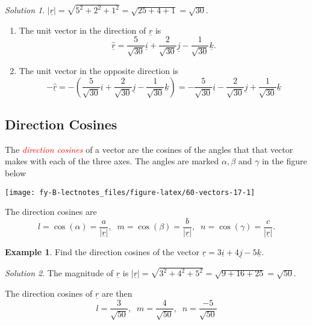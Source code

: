 \documentclass[
  11pt,
  oneside]{book}
\providecommand{\tightlist}{%
  \setlength{\itemsep}{0pt}\setlength{\parskip}{0pt}}
\newcommand{\slide}{}
\theoremstyle{definition}
\theoremstyle{definition}
\newtheorem{example}{Example}[chapter]
\theoremstyle{definition}
\theoremstyle{definition}
\theoremstyle{remark}
\newtheorem*{solution}{Solution}
\begin{document}
\begin{solution}

\(|\underline r| = \sqrt{5^2+2^2+1^2} = \sqrt{25+4+1} = \sqrt{30}\).

\begin{enumerate}
\def\labelenumi{\alph{enumi}.}
\tightlist
\item
  The unit vector in the direction of \(\underline r\) is
  \[
  \underline{\hat r} = \frac5{\sqrt{30}}\underline i+\frac2{\sqrt{30}}\underline j-\frac1{\sqrt{30}}\underline k.
  \]
\item
  The unit vector in the opposite direction is
  \[
  -\underline{\hat r} = -\left(\frac{5}{\sqrt{30}}\underline i+\frac{2}{\sqrt{30}}\underline j-\frac{1}{\sqrt{30}}\underline k\right) = -\frac{5}{\sqrt{30}}\underline i-\frac{2}{\sqrt{30}}\underline j+\frac{1}{\sqrt{30}}\underline k
  \]
\end{enumerate}

\end{solution}

\slide

\subsection{Direction Cosines}\label{direction-cosines}

The \textcolor{red}{\em direction cosines} of a vector are the cosines of the angles that that vector makes with each of
the three axes. The angles are marked \(\alpha, \beta\) and \(\gamma\) in the figure below

\begin{center}\texttt{[image: fy-B-lectnotes\_files/figure-latex/60-vectors-17-1]} \end{center}

The direction cosines are
\[
l = \cos(\alpha) = \frac{a}{|\underline r|},\;\;m = \cos(\beta) = \frac{b}{|\underline r|},\;\;n = \cos(\gamma) = \frac{c}{|\underline r|}.
\]
\slide

\begin{example}
Find the direction cosines of the vector \(\underline r = 3\underline i + 4\underline j - 5\underline k\).
\end{example}

\begin{solution}
The magnitude of \(\underline r\) is \(|\underline r| = \sqrt{3^2+4^2+5^2} = \sqrt{9+16+25} = \sqrt{50}\).

The direction cosines of \(\underline r\) are then
\[
l = \frac{3}{\sqrt{50}},\;\;m = \frac{4}{\sqrt{50}},\;\;n = \frac{-5}{\sqrt{50}}
\]
\end{solution}
\end{document}
